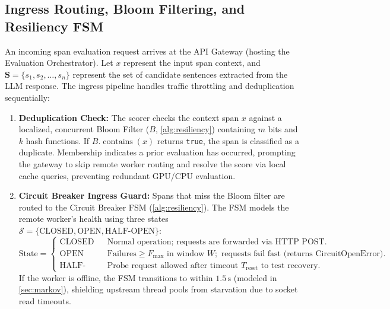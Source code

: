 \documentclass[11pt,a4paper]{article}
\theoremstyle{plain}
\theoremstyle{definition}
\theoremstyle{remark}
\begin{document}
\subsection{Ingress Routing, Bloom Filtering, and Resiliency FSM}
An incoming span evaluation request arrives at the API Gateway (hosting the Evaluation Orchestrator). Let $x$ represent the input span context, and $\mathbf{S}=\{s_1, s_2, \dots, s_n\}$ represent the set of candidate sentences extracted from the LLM response. The ingress pipeline handles traffic throttling and deduplication sequentially:
\begin{enumerate}
    \item \textbf{Deduplication Check:} The scorer checks the context span $x$ against a localized, concurrent Bloom Filter ($B$, \cref{alg:resiliency}) containing $m$ bits and $k$ hash functions. If $B.\operatorname{contains}(x)$ returns \texttt{true}, the span is classified as a duplicate. Membership indicates a prior evaluation has occurred, prompting the gateway to skip remote worker routing and resolve the score via local cache queries, preventing redundant GPU/CPU evaluation.
    \item \textbf{Circuit Breaker Ingress Guard:} Spans that miss the Bloom filter are routed to the Circuit Breaker FSM (\cref{alg:resiliency}). The FSM models the remote worker's health using three states $\mathcal{S} = \{\text{CLOSED}, \text{OPEN}, \text{HALF-OPEN}\}$:
    \begin{equation}
        \text{State} = \begin{cases}
            \text{CLOSED} & \text{Normal operation; requests are forwarded via HTTP POST.} \\
            \text{OPEN} & \text{Failures} \ge F_{\max} \text{ in window } W; \text{ requests fail fast (returns } \text{CircuitOpenError}). \\
            \text{HALF-OPEN} & \text{Probe request allowed after timeout } T_{\text{reset}} \text{ to test recovery.}
        \end{cases}
    \end{equation}
    If the worker is offline, the FSM transitions to  within $1.5\,\mathrm{s}$ (modeled in \cref{sec:markov}), shielding upstream thread pools from starvation due to socket read timeouts.
\end{enumerate}
\end{document}
